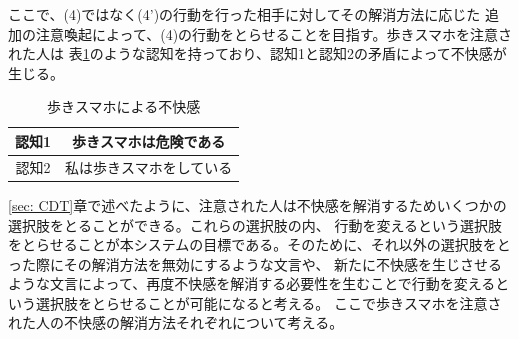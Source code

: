 \documentclass{kuisthesis}
\begin{document}
ここで、(4)ではなく(4')の行動を行った相手に対してその解消方法に応じた
追加の注意喚起によって、(4)の行動をとらせることを目指す。歩きスマホを注意された人は
表\ref{fig: UsingPhone}のような認知を持っており、認知1と認知2の矛盾によって不快感が生じる。
\begin{table}[h]
  \centering
  \caption{歩きスマホによる不快感}
  \label{fig: UsingPhone}
  \begin{tabular}{c|c}

      認知1 & 歩きスマホは危険である  \\ \hline
      認知2 & 私は歩きスマホをしている \\ 
  \end{tabular}
\end{table}
\ref{sec: CDT}章で述べたように、注意された人は不快感を解消するためいくつかの選択肢をとることができる。これらの選択肢の内、
行動を変えるという選択肢をとらせることが本システムの目標である。そのために、それ以外の選択肢をとった際にその解消方法を無効にするような文言や、
新たに不快感を生じさせるような文言によって、再度不快感を解消する必要性を生むことで行動を変えるという選択肢をとらせることが可能になると考える。
ここで歩きスマホを注意された人の不快感の解消方法それぞれについて考える。
\end{document}
